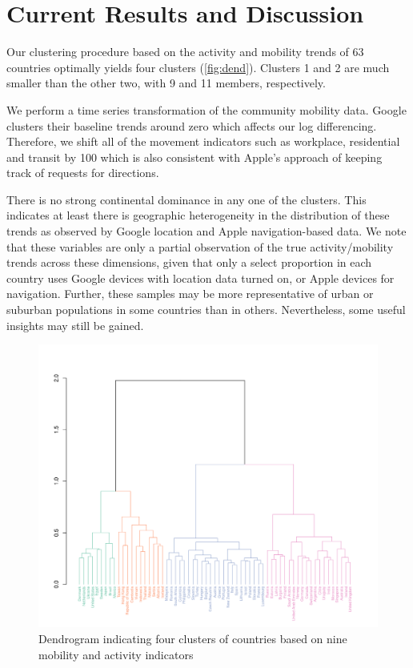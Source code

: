 \documentclass[titlepage,oneside,12pt]{article}
\newcommand{\?}{\stackrel{?}{=}}
\begin{document}
\section{Current Results and Discussion}
Our clustering procedure based on the activity and mobility trends of 63 countries optimally yields four clusters (\autoref{fig:dend}).
Clusters 1 and 2 are much smaller than the other two, with 9 and 11 members, respectively.

We perform a time series transformation of the community mobility data. Google clusters their baseline trends around zero which affects our log differencing.
Therefore, we shift all of the movement indicators such as workplace, residential and transit by 100 which is also consistent with Apple's approach of keeping track of requests for directions.

There is no strong continental dominance in any one of the clusters.
This indicates at least there is geographic heterogeneity in the distribution of these trends as observed by Google location and Apple navigation-based data.
We note that these variables are only a partial observation of the true activity/mobility trends across these dimensions, given that only a select proportion in each country uses Google devices with location data turned on, or Apple devices for navigation.
Further, these samples may be more representative of urban or suburban populations in some countries than in others.
Nevertheless, some useful insights may still be gained.

\begin{figure}[h!]
  \includegraphics[width=\textwidth,trim={0cm 0 1.9cm 7cm},clip]{dendrogram}
  \caption{Dendrogram indicating four clusters of countries based on nine mobility and activity indicators}
  \label{fig:dend}
\end{figure}
\end{document}
